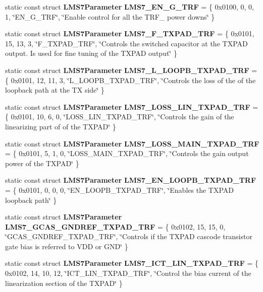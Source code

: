 \begin{DoxyCompactItemize}
\item 
static const struct {\bf L\+M\+S7\+Parameter} {\bf L\+M\+S7\+\_\+\+E\+N\+\_\+\+G\+\_\+\+T\+RF} = \{ 0x0100, 0, 0, 1, \char`\"{}\+E\+N\+\_\+\+G\+\_\+\+T\+R\+F\char`\"{}, \char`\"{}\+Enable control for all the T\+R\+F\+\_ power downs\char`\"{} \}
\item 
static const struct {\bf L\+M\+S7\+Parameter} {\bf L\+M\+S7\+\_\+\+F\+\_\+\+T\+X\+P\+A\+D\+\_\+\+T\+RF} = \{ 0x0101, 15, 13, 3, \char`\"{}\+F\+\_\+\+T\+X\+P\+A\+D\+\_\+\+T\+R\+F\char`\"{}, \char`\"{}\+Controls the switched capacitor at the T\+X\+P\+A\+D output. Is used for fine tuning of the T\+X\+P\+A\+D output\char`\"{} \}
\item 
static const struct {\bf L\+M\+S7\+Parameter} {\bf L\+M\+S7\+\_\+\+L\+\_\+\+L\+O\+O\+P\+B\+\_\+\+T\+X\+P\+A\+D\+\_\+\+T\+RF} = \{ 0x0101, 12, 11, 3, \char`\"{}\+L\+\_\+\+L\+O\+O\+P\+B\+\_\+\+T\+X\+P\+A\+D\+\_\+\+T\+R\+F\char`\"{}, \char`\"{}\+Controls the loss of the of the loopback path at the T\+X side\char`\"{} \}
\item 
static const struct {\bf L\+M\+S7\+Parameter} {\bf L\+M\+S7\+\_\+\+L\+O\+S\+S\+\_\+\+L\+I\+N\+\_\+\+T\+X\+P\+A\+D\+\_\+\+T\+RF} = \{ 0x0101, 10, 6, 0, \char`\"{}\+L\+O\+S\+S\+\_\+\+L\+I\+N\+\_\+\+T\+X\+P\+A\+D\+\_\+\+T\+R\+F\char`\"{}, \char`\"{}\+Controls the gain of the linearizing part of of the T\+X\+P\+A\+D\char`\"{} \}
\item 
static const struct {\bf L\+M\+S7\+Parameter} {\bf L\+M\+S7\+\_\+\+L\+O\+S\+S\+\_\+\+M\+A\+I\+N\+\_\+\+T\+X\+P\+A\+D\+\_\+\+T\+RF} = \{ 0x0101, 5, 1, 0, \char`\"{}\+L\+O\+S\+S\+\_\+\+M\+A\+I\+N\+\_\+\+T\+X\+P\+A\+D\+\_\+\+T\+R\+F\char`\"{}, \char`\"{}\+Controls the gain output power of the T\+X\+P\+A\+D\char`\"{} \}
\item 
static const struct {\bf L\+M\+S7\+Parameter} {\bf L\+M\+S7\+\_\+\+E\+N\+\_\+\+L\+O\+O\+P\+B\+\_\+\+T\+X\+P\+A\+D\+\_\+\+T\+RF} = \{ 0x0101, 0, 0, 0, \char`\"{}\+E\+N\+\_\+\+L\+O\+O\+P\+B\+\_\+\+T\+X\+P\+A\+D\+\_\+\+T\+R\+F\char`\"{}, \char`\"{}\+Enables the T\+X\+P\+A\+D loopback path\char`\"{} \}
\item 
static const struct {\bf L\+M\+S7\+Parameter} {\bf L\+M\+S7\+\_\+\+G\+C\+A\+S\+\_\+\+G\+N\+D\+R\+E\+F\+\_\+\+T\+X\+P\+A\+D\+\_\+\+T\+RF} = \{ 0x0102, 15, 15, 0, \char`\"{}\+G\+C\+A\+S\+\_\+\+G\+N\+D\+R\+E\+F\+\_\+\+T\+X\+P\+A\+D\+\_\+\+T\+R\+F\char`\"{}, \char`\"{}\+Controls if the T\+X\+P\+A\+D cascode transistor gate bias is referred to V\+D\+D or G\+N\+D\char`\"{} \}
\item 
static const struct {\bf L\+M\+S7\+Parameter} {\bf L\+M\+S7\+\_\+\+I\+C\+T\+\_\+\+L\+I\+N\+\_\+\+T\+X\+P\+A\+D\+\_\+\+T\+RF} = \{ 0x0102, 14, 10, 12, \char`\"{}\+I\+C\+T\+\_\+\+L\+I\+N\+\_\+\+T\+X\+P\+A\+D\+\_\+\+T\+R\+F\char`\"{}, \char`\"{}\+Control the bias current of the linearization section of the T\+X\+P\+A\+D\char`\"{} \}

\end{DoxyCompactItemize}

